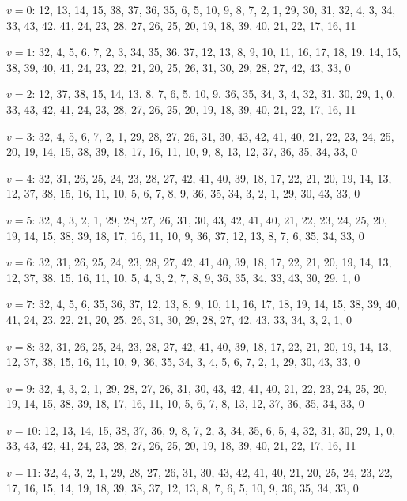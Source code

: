\documentclass{amcjoucc}
\begin{document}
\begin{itemize}
{\footnotesize
\item $v = 0$: 12, 13, 14, 15, 38, 37, 36, 35, 6, 5, 10, 9, 8, 7, 2, 1, 29, 30, 31, 32, 4, 3, 34, 33, 43, 42, 41, 24, 23, 28, 27, 26, 25, 20, 19, 18, 39, 40, 21, 22, 17, 16, 11
\item $v = 1$: 32, 4, 5, 6, 7, 2, 3, 34, 35, 36, 37, 12, 13, 8, 9, 10, 11, 16, 17, 18, 19, 14, 15, 38, 39, 40, 41, 24, 23, 22, 21, 20, 25, 26, 31, 30, 29, 28, 27, 42, 43, 33, 0
\item $v = 2$: 12, 37, 38, 15, 14, 13, 8, 7, 6, 5, 10, 9, 36, 35, 34, 3, 4, 32, 31, 30, 29, 1, 0, 33, 43, 42, 41, 24, 23, 28, 27, 26, 25, 20, 19, 18, 39, 40, 21, 22, 17, 16, 11
\item $v = 3$: 32, 4, 5, 6, 7, 2, 1, 29, 28, 27, 26, 31, 30, 43, 42, 41, 40, 21, 22, 23, 24, 25, 20, 19, 14, 15, 38, 39, 18, 17, 16, 11, 10, 9, 8, 13, 12, 37, 36, 35, 34, 33, 0
\item $v = 4$: 32, 31, 26, 25, 24, 23, 28, 27, 42, 41, 40, 39, 18, 17, 22, 21, 20, 19, 14, 13, 12, 37, 38, 15, 16, 11, 10, 5, 6, 7, 8, 9, 36, 35, 34, 3, 2, 1, 29, 30, 43, 33, 0
\item $v = 5$: 32, 4, 3, 2, 1, 29, 28, 27, 26, 31, 30, 43, 42, 41, 40, 21, 22, 23, 24, 25, 20, 19, 14, 15, 38, 39, 18, 17, 16, 11, 10, 9, 36, 37, 12, 13, 8, 7, 6, 35, 34, 33, 0
\item $v = 6$: 32, 31, 26, 25, 24, 23, 28, 27, 42, 41, 40, 39, 18, 17, 22, 21, 20, 19, 14, 13, 12, 37, 38, 15, 16, 11, 10, 5, 4, 3, 2, 7, 8, 9, 36, 35, 34, 33, 43, 30, 29, 1, 0
\item $v = 7$: 32, 4, 5, 6, 35, 36, 37, 12, 13, 8, 9, 10, 11, 16, 17, 18, 19, 14, 15, 38, 39, 40, 41, 24, 23, 22, 21, 20, 25, 26, 31, 30, 29, 28, 27, 42, 43, 33, 34, 3, 2, 1, 0
\item $v = 8$: 32, 31, 26, 25, 24, 23, 28, 27, 42, 41, 40, 39, 18, 17, 22, 21, 20, 19, 14, 13, 12, 37, 38, 15, 16, 11, 10, 9, 36, 35, 34, 3, 4, 5, 6, 7, 2, 1, 29, 30, 43, 33, 0
\item $v = 9$: 32, 4, 3, 2, 1, 29, 28, 27, 26, 31, 30, 43, 42, 41, 40, 21, 22, 23, 24, 25, 20, 19, 14, 15, 38, 39, 18, 17, 16, 11, 10, 5, 6, 7, 8, 13, 12, 37, 36, 35, 34, 33, 0
\item $v = 10$: 12, 13, 14, 15, 38, 37, 36, 9, 8, 7, 2, 3, 34, 35, 6, 5, 4, 32, 31, 30, 29, 1, 0, 33, 43, 42, 41, 24, 23, 28, 27, 26, 25, 20, 19, 18, 39, 40, 21, 22, 17, 16, 11
\item $v = 11$: 32, 4, 3, 2, 1, 29, 28, 27, 26, 31, 30, 43, 42, 41, 40, 21, 20, 25, 24, 23, 22, 17, 16, 15, 14, 19, 18, 39, 38, 37, 12, 13, 8, 7, 6, 5, 10, 9, 36, 35, 34, 33, 0
}
\end{itemize}
\end{document}
